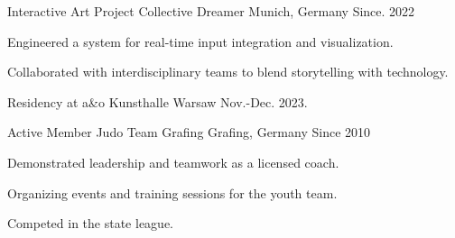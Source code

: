 \begin{cventries}
 
 \cventry
 {Interactive Art Project} 
 {Collective Dreamer} 
 {Munich, Germany} %
 {Since. 2022} %
 {
   \begin{cvitems} %
     \item {Engineered a system for real-time input integration and visualization.}
     \item {Collaborated with interdisciplinary teams to blend storytelling with technology.}
     \item {Residency at a\&o Kunsthalle Warsaw Nov.-Dec. 2023.}
   \end{cvitems}
 }

  \cventry
  {Active Member} %
  {Judo Team Grafing} %
  {Grafing, Germany} %
  {Since 2010} %
  {
    \begin{cvitems} %
      \item {Demonstrated leadership and teamwork as a licensed coach.}
      \item {Organizing events and training sessions for the youth team.}
      \item {Competed in the state league.}
    \end{cvitems}
  }

\end{cventries}